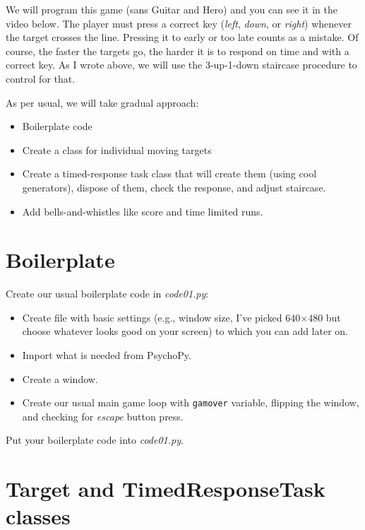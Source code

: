 \documentclass[
]{book}
\providecommand{\tightlist}{%
  \setlength{\itemsep}{0pt}\setlength{\parskip}{0pt}}
\begin{document}
We will program this game (sans Guitar and Hero) and you can see it in the video below. The player must press a correct key (\emph{left}, \emph{down}, or \emph{right}) whenever the target crosses the line. Pressing it to early or too late counts as a mistake. Of course, the faster the targets go, the harder it is to respond on time and with a correct key. As I wrote above, we will use the 3-up-1-down staircase procedure to control for that.

As per usual, we will take gradual approach:

\begin{itemize}
\tightlist
\item
  Boilerplate code
\item
  Create a class for individual moving targets
\item
  Create a timed-response task class that will create them (using cool generators), dispose of them, check the response, and adjust staircase.
\item
  Add bells-and-whistles like score and time limited runs.
\end{itemize}

\hypertarget{boilerplate}{%
\section{Boilerplate}\label{boilerplate}}

Create our usual boilerplate code in \emph{code01.py}:

\begin{itemize}
\tightlist
\item
  Create file with basic settings (e.g., window size, I've picked 640×480 but choose whatever looks good on your screen) to which you can add later on.
\item
  Import what is needed from PsychoPy.
\item
  Create a window.
\item
  Create our usual main game loop with \texttt{gamover} variable, flipping the window, and checking for \emph{escape} button press.
\end{itemize}

Put your boilerplate code into \emph{code01.py}.

\hypertarget{target-and-timedresponsetask-classes}{%
\section{Target and TimedResponseTask classes}\label{target-and-timedresponsetask-classes}}
\end{document}
